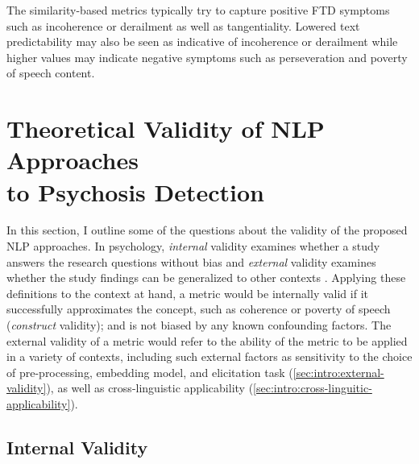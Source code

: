 The similarity-based metrics typically try to capture positive FTD symptoms such as incoherence or derailment as well as tangentiality. Lowered text predictability may also be seen as indicative of incoherence or derailment while higher values may indicate negative symptoms such as perseveration and poverty of speech content.


\section{Theoretical Validity of NLP Approaches \\ to Psychosis Detection}
\label{sec:intro:validity}

In this section, I outline some of the questions about the validity of the proposed NLP approaches. In psychology, \textit{internal} validity examines whether a study answers the research questions without bias and \textit{external} validity examines whether the study findings can be generalized to other contexts \citep{andrade2018internal}. Applying these definitions to the context at hand, 
a metric would be internally valid if it successfully approximates the concept, such as coherence or poverty of speech (\textit{construct} validity); and is not biased by any known confounding factors. The external validity of a metric would refer to the ability of the metric to be applied in a variety of contexts, including such external factors as sensitivity to the choice of pre-processing, embedding model, and elicitation task (\ref{sec:intro:external-validity}), as well as cross-linguistic applicability (\ref{sec:intro:cross-linguitic-applicability}).

\subsection{Internal Validity}
\label{sec:intro:internal-validity}

